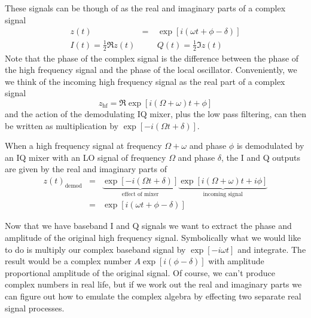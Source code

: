These signals can be though of as the real and imaginary parts of a complex signal \begin{eqnarray}
z(t) &=& \exp \left[i \left( \omega t + \phi - \delta \right) \right] \\
I(t) = \frac{1}{2}\Re z(t) & \quad & Q(t) = \frac{1}{2}\Im z(t) \end{eqnarray}
Note that the phase of the complex signal is the difference between the phase of the high frequency signal and the phase of the local oscillator. Conveniently, we we think of the incoming high frequency signal as the real part of a complex signal \begin{equation}
z_{\textrm{hf}}=\Re \exp \left[ i \left( \Omega + \omega \right)t +\phi \right]  \end{equation}
and the action of the demodulating IQ mixer, plus the low pass filtering, can then be written as multiplication by $\exp \left[ -i( \Omega t + \delta ) \right]$.


When a high frequency signal at frequency $\Omega+\omega$ and phase $\phi$ is demodulated by an IQ mixer with an LO signal of frequency $\Omega$ and phase $\delta$, the I and Q outputs are given by the real and imaginary parts of \begin{eqnarray}
z(t)_{\textrm{demod}} &=& \underbrace{\exp \left[-i \left( \Omega t + \delta \right) \right]}_{\textrm{effect of mixer}} \underbrace{\exp \left[ i\left( \Omega + \omega \right) t + i \phi \right]}_{\textrm{incoming signal}} \nonumber \\
&=& \exp \left[ i \left( \omega t + \phi-\delta \right) \right] \nonumber \end{eqnarray}


Now that we have baseband I and Q signals we want to extract the phase and amplitude of the original high frequency signal. Symbolically what we would like to do is multiply our complex baseband signal by $\exp \left[ -i \omega t \right]$ and integrate. The result would be a complex number $A \exp \left[ i \left( \phi - \delta \right) \right]$ with amplitude proportional amplitude of the original signal. Of course, we can't produce complex numbers in real life, but if we work out the real and imaginary parts we can figure out how to emulate the complex algebra by effecting two separate real signal processes.

